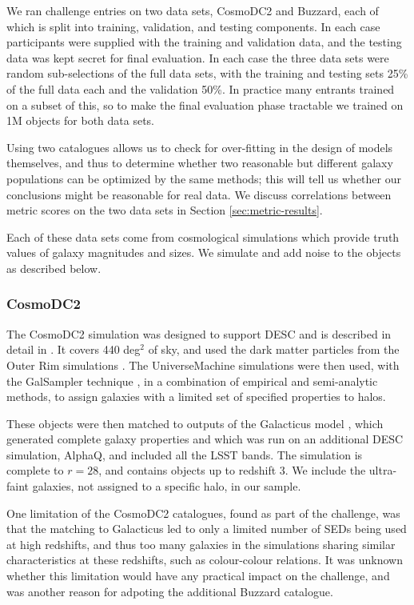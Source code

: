 \documentclass[twocolumn,twocolappendix]{aastex63}
\begin{document}
We ran challenge entries on two data sets, CosmoDC2 and Buzzard, each of which is split into training, 
validation, and testing components.  In each case participants were supplied with the training and 
validation data, and the testing data was kept secret for final evaluation. In each case the three
data sets were random sub-selections of the full data sets, with the training and testing sets 25\% of 
the full data each and the validation 50\%. In practice many entrants trained on a subset of
this, so to make the final evaluation phase tractable we trained on 1M objects for both data sets.

Using two catalogues allows us to check
for over-fitting in the design of models themselves, and thus to determine whether two
reasonable but different galaxy populations can be optimized by the same methods; this will
tell us whether our conclusions might be reasonable for real data. We discuss correlations
between metric scores on the two data sets in Section \ref{sec:metric-results}.

Each of these data sets come from cosmological simulations which provide truth values of galaxy magnitudes
and sizes.  We simulate and add noise to the objects as described below.

\subsubsection{CosmoDC2}

The CosmoDC2 simulation was designed to support DESC and 
is described in detail in \citet{cosmodc2}.  It covers 440
deg${}^2$ of sky, and used the dark matter particles from the Outer Rim
simulations \citep{outer_rim}.  The UniverseMachine \citep{universe_machine}
simulations were then used, with the GalSampler technique \citep{galsampler},
in a combination of empirical and semi-analytic
methods, to assign galaxies with a limited set of specified properties to halos.

These objects were then matched to outputs of the Galacticus model
\citep{galacticus}, which generated complete galaxy properties and which was run
on an additional DESC simulation, AlphaQ, and included all the LSST bands.  The
simulation is complete to $r=28$, and contains objects up to redshift 3.  We
include the ultra-faint galaxies, not assigned to a specific halo, in our sample.

One limitation of the CosmoDC2 catalogues, found as part of the challenge,
was that the matching to Galacticus led to only a limited number of SEDs being
used at high redshifts, and thus too many galaxies in the simulations sharing
similar characteristics at these redshifts, such as colour-colour relations.
It was unknown whether this limitation would have any practical impact on the challenge,
and was another reason for adpoting the additional Buzzard catalogue.
\end{document}
